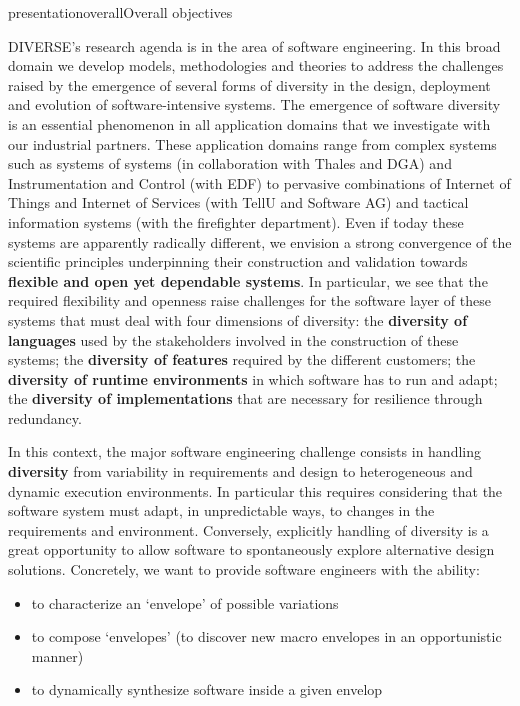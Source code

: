 \documentclass{ra2018}
\newcommand{\team}{DIVERSE}
\begin{document}
\begin{module}{presentation}{overall}{Overall objectives}

  \team{}'s research agenda is in the area of software engineering. 
  In this broad domain we develop models, methodologies and theories to address the challenges raised by the emergence of several forms of diversity in the design, deployment and evolution of software-intensive systems.
  The emergence of software diversity is an essential phenomenon in all application domains that we investigate with our industrial partners. These application domains range from complex systems such as systems of systems (in collaboration with Thales and DGA) and Instrumentation and Control (with EDF) to pervasive combinations of Internet of Things and Internet of Services (with TellU and Software AG) and tactical information systems (with the firefighter department).
  Even if today these systems are apparently radically different, we envision a strong convergence  of the scientific principles underpinning their construction and validation towards \textbf{flexible and open yet dependable systems}. 
  In particular, we see that the required flexibility and openness raise challenges for the software layer of these systems that must deal with four dimensions of diversity: the \textbf{diversity of languages} used by the stakeholders involved in the construction of these systems; the \textbf{diversity of features} required by the different customers; the \textbf{diversity of runtime environments} in which software has to run and adapt; the \textbf{diversity of implementations} that are necessary for resilience through redundancy.

  In this context, the major software engineering challenge consists in handling \textbf{diversity} from variability in requirements and design to heterogeneous and dynamic execution environments. 
  In particular this requires considering that the software system must adapt, in unpredictable ways, to changes in the requirements and environment. 
  Conversely, explicitly handling of diversity is a great opportunity to allow software to spontaneously explore alternative design solutions. 
  Concretely, we want to provide software engineers with the ability:
  \begin{itemize}
      \item to characterize an `envelope' of possible variations
      \item to compose `envelopes' (to discover new macro envelopes in an opportunistic manner)
      \item to dynamically synthesize software inside a given  envelop
  \end{itemize}


\end{module}
\end{document}
